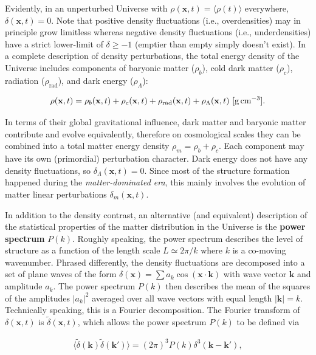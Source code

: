 \documentclass[a4paper,11pt]{article}
\begin{document}
{\noindent}Evidently, in an unperturbed Universe with $\rho(\mathbf{x},t) = \langle\rho(t)\rangle$ everywhere, $\delta(\mathbf{x},t) = 0$. Note that positive density fluctuations (i.e., overdensities) may in principle grow limitless whereas negative density fluctuations (i.e., underdensities) have a strict lower-limit of $\delta \geq -1$ (emptier than empty simply doesn't exist). In a complete description of density perturbations, the total energy density of the Universe includes components of baryonic matter ($\rho_b$), cold dark matter ($\rho_c$), radiation ($\rho_\mathrm{rad}$), and dark energy ($\rho_\Lambda$):

\begin{align*}
    \rho(\mathbf{x},t) = \rho_b(\mathbf{x},t) + \rho_c(\mathbf{x},t) + \rho_\mathrm{rad}(\mathbf{x},t) + \rho_\Lambda(\mathbf{x},t) ~ [{\rm g\,cm^{-3}}].
\end{align*}

{\noindent}In terms of their global gravitational influence, dark matter and baryonic matter contribute and evolve equivalently, therefore on cosmological scales they can be combined into a total matter energy density $\rho_m = \rho_b + \rho_c$. Each component may have its own (primordial) perturbation character. Dark energy does not have any density fluctuations, so $\delta_\Lambda(\mathbf{x},t) = 0$. Since most of the structure formation happened during the \textit{matter-dominated era}, this mainly involves the evolution of matter linear perturbations $\delta_m(\mathbf{x},t)$.

{\noindent}In addition to the density contrast, an alternative (and equivalent) description of the statistical properties of the matter distribution in the Universe is the \textbf{power spectrum} $P(k)$. Roughly speaking, the power spectrum describes the level of structure as a function of the length scale $L \simeq 2\pi/k$ where $k$ is a co-moving wavenumber. Phrased differently, the density fluctuations are decomposed into a set of plane waves of the form $\delta(\mathbf{x}) = \sum a_k\cos(\mathbf{x\cdot k})$ with wave vector $\mathbf{k}$ and amplitude $a_k$. The power spectrum $P(k)$ then describes the mean of the squares of the amplitudes $\lvert a_k \rvert^2$ averaged over all wave vectors with equal length $\lvert\mathbf{k}\rvert = k$. Technically speaking, this is a Fourier decomposition. The Fourier transform of $\delta(\mathbf{x},t)$ is $\tilde{\delta}(\mathbf{x},t)$, which allows the power spectrum $P(k)$ to be defined via

\begin{align*}
    \langle \tilde{\delta}(\mathbf{k}) \tilde{\delta}(\mathbf{k'}) \rangle = (2\pi)^3 P(k) \delta^3 (\mathbf{k} - \mathbf{k'}),
\end{align*}
\end{document}
